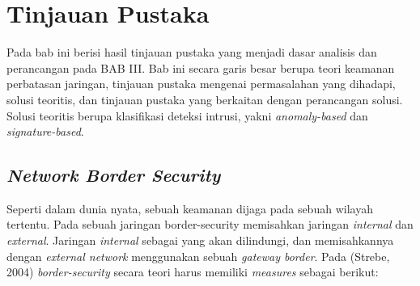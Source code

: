 \chapter{Tinjauan Pustaka}

Pada bab ini berisi hasil tinjauan pustaka yang menjadi dasar analisis dan perancangan pada BAB III. Bab ini secara garis besar berupa teori keamanan perbatasan jaringan, tinjauan pustaka mengenai permasalahan yang dihadapi, solusi teoritis, dan tinjauan pustaka yang berkaitan dengan perancangan solusi. Solusi teoritis berupa klasifikasi deteksi intrusi, yakni \textit{anomaly-based} dan \textit{signature-based}.

\section{\textit{Network Border Security}}

Seperti dalam dunia nyata, sebuah keamanan dijaga pada sebuah wilayah tertentu. Pada sebuah jaringan border-security memisahkan jaringan \textit{internal} dan \textit{external}. Jaringan \textit{internal} sebagai yang akan dilindungi, dan memisahkannya dengan \textit{external network} menggunakan sebuah \textit{gateway border}. Pada (Strebe, 2004) \textit{border-security} secara teori harus memiliki \textit{measures} sebagai berikut:

